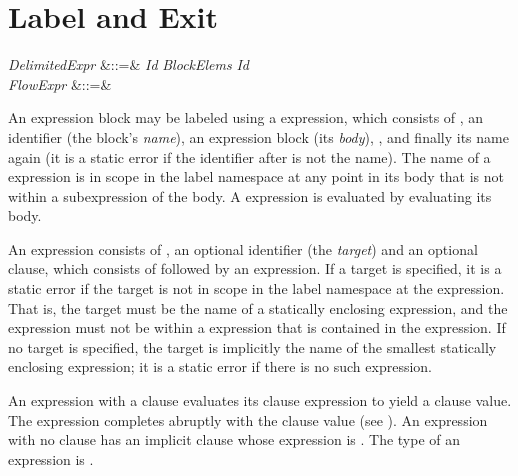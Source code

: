 %
%
%
%

\section{Label and Exit}

\begin{Grammar}
\emph{DelimitedExpr} &::=&
 \emph{Id} \emph{BlockElems}  \emph{Id} \\

\emph{FlowExpr}
&::=&    \\

\end{Grammar}

An expression block may be labeled using a  expression,
which consists of , an identifier (the block's \emph{name}),
an expression block (its \emph{body}), , and finally its name again
(it is a static error if the identifier after  is not the name).
The name of a  expression
is in scope in the label namespace
at any point in its body
that is not within a  subexpression of the body.
A  expression is evaluated
by evaluating its body.

An  expression consists of ,
an optional identifier (the \emph{target})
and an optional  clause,
which consists of  followed by an expression.
If a target is specified, it is
a static error if the target is not in scope
in the label namespace at the  expression.
That is, the target must be the name
of a statically enclosing  expression,
and the  expression must not be within
a  expression that is contained
in the  expression.
If no target is specified, the target is implicitly the name
of the smallest statically enclosing  expression; it is
a static error if there is no such expression.

An  expression with a  clause
evaluates its  clause expression to yield a  clause value.
The  expression completes abruptly with the  clause value
(see ).
An  expression with no  clause
has an implicit  clause whose expression is \EXP{()}.
The type of an  expression is .

